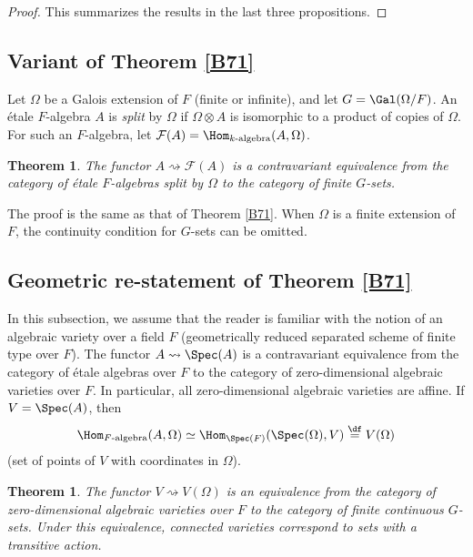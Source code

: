 \documentclass[a4paper,11pt,final,openany]{memoir}
\newtheorem{theorem}[X]{Theorem}
\theoremstyle{nonumberplain}
\newtheorem{proof}{Proof.}
\begin{document}
\begin{proof}
This summarizes the results in the last three propositions.
\end{proof}

\subsection{Variant of Theorem \ref{B71}}

Let $\Omega$ be a Galois extension of $F$ (finite or infinite), and let
$G=\Gal(\Omega/F)$. An \'{e}tale $F$-algebra $A$ is \emph{split} by $\Omega$
if $\Omega\otimes A$ is isomorphic to a product of copies of $\Omega$. For
such an $F$-algebra, let $\mathcal{F}{}(A)=\Hom_{k\text{-algebra}}(A,\Omega)$.

\begin{theorem}
\label{B71a}The functor $A\rightsquigarrow\mathcal{F}{}(A)$ is a contravariant
equivalence from the category of \'{e}tale $F$-algebras split by $\Omega$ to
the category of finite $G$-sets.
\end{theorem}

The proof is the same as that of Theorem \ref{B71}. When $\Omega$ is a finite
extension of $F$, the continuity condition for $G$-sets can be omitted.

\subsection{Geometric re-statement of Theorem \ref{B71}}

In this subsection, we assume that the reader is familiar with the notion of
an algebraic variety over a field $F$ (geometrically reduced separated scheme
of finite type over $F$). The functor $A\rightsquigarrow\Spec(A)$ is a
contravariant equivalence from the category of \'{e}tale algebras over $F$ to
the category of zero-dimensional algebraic varieties over $F$. In particular,
all zero-dimensional algebraic varieties are affine. If $V=\Spec(A)$, then
\[
\Hom_{F\text{-algebra}}(A,\Omega)\simeq\Hom_{\Spec(F)}(\Spec(\Omega
),V)\overset{\df}{=}V(\Omega)
\]
(set of points of $V$ with coordinates in $\Omega$).

\begin{theorem}
\label{B72}The functor $V\rightsquigarrow V(\Omega)$ is an equivalence from
the category of zero-dimensional algebraic varieties over $F$ to the category
of finite continuous $G$-sets. Under this equivalence, connected varieties
correspond to sets with a transitive action.
\end{theorem}
\end{document}
